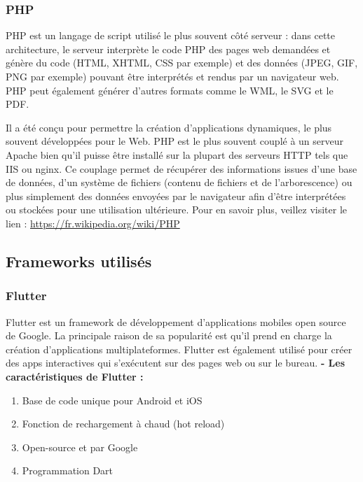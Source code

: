 \subsubsection{PHP}
PHP est un langage de script utilisé le plus souvent côté serveur : dans cette architecture, le serveur interprète le code PHP des pages web demandées et génère du code (HTML, XHTML, CSS par exemple) et des données (JPEG, GIF, PNG par exemple) pouvant être interprétés et rendus par un navigateur web. PHP peut également générer d'autres formats comme le WML, le SVG et le PDF.

Il a été conçu pour permettre la création d'applications dynamiques, le plus souvent développées pour le Web. PHP est le plus souvent couplé à un serveur Apache bien qu'il puisse être installé sur la plupart des serveurs HTTP tels que IIS ou nginx. Ce couplage permet de récupérer des informations issues d'une base de données, d'un système de fichiers (contenu de fichiers et de l'arborescence) ou plus simplement des données envoyées par le navigateur afin d'être interprétées ou stockées pour une utilisation ultérieure.
\newline Pour en savoir plus, veillez
visiter le lien : \href{https://fr.wikipedia.org/wiki/PHP}{https://fr.wikipedia.org/wiki/PHP}
\subsection{Frameworks utilisés}

\subsubsection{Flutter}
Flutter est un framework de développement d’applications mobiles open source de Google. La principale raison de sa popularité est qu’il prend en charge la création 		   
d’applications multiplateformes. Flutter est également utilisé pour créer des apps interactives qui s’exécutent sur des pages web ou sur le bureau.\newline
\textbf {- Les caractéristiques de Flutter :}


\begin{enumerate}
	\item Base de code unique pour Android et iOS
	\item Fonction de rechargement à chaud (hot reload)
	\item Open-source et par Google
	\item Programmation Dart \newline \newline \newline
\end{enumerate}


